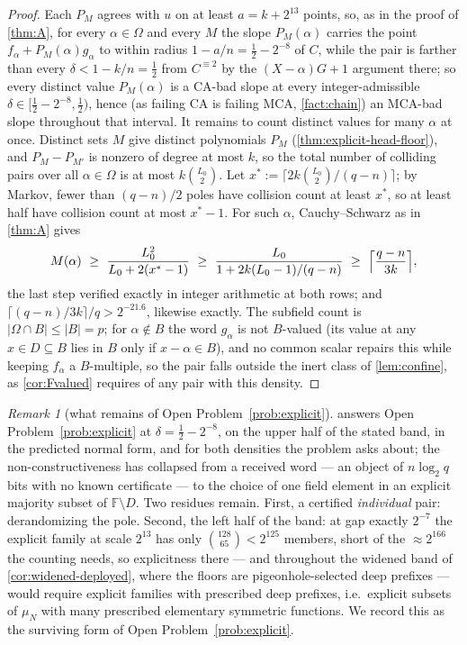 \documentclass[11pt]{article}
\theoremstyle{definition}
\theoremstyle{remark}
\newtheorem{remark}[theorem]{Remark}
\newcommand{\F}{\mathbb{F}}
\newcommand{\B}{B}
\begin{document}
\begin{proof}
Each $P_M$ agrees with $u$ on at least $a=k+2^{13}$ points, so, as in the proof of \cref{thm:A}, for every $\alpha\in\Omega$ and every $M$ the slope $P_M(\alpha)$ carries the point $f_\alpha+P_M(\alpha)g_\alpha$ to within radius $1-a/n=\frac12-2^{-8}$ of $C$, while the pair is farther than every $\delta<1-k/n=\frac12$ from $C^{\equiv2}$ by the $(X-\alpha)G+1$ argument there; so every distinct value $P_M(\alpha)$ is a CA-bad slope at every integer-admissible $\delta\in[\frac12-2^{-8},\frac12)$, hence \textup(as failing CA is failing MCA, \cref{fact:chain}\textup) an MCA-bad slope throughout that interval. It remains to count distinct values for many $\alpha$ at once. Distinct sets $M$ give distinct polynomials $P_M$ \textup(\cref{thm:explicit-head-floor}\textup), and $P_M-P_{M'}$ is nonzero of degree at most $k$, so the total number of colliding pairs over all $\alpha\in\Omega$ is at most $k\binom{L_0}2$. Let $x^*:=\lceil2k\binom{L_0}2/(q-n)\rceil$; by Markov, fewer than $(q-n)/2$ poles have collision count at least $x^*$, so at least half have collision count at most $x^*-1$. For such $\alpha$, Cauchy--Schwarz as in \cref{thm:A} gives
\[
M(\alpha)\ \ge\ \frac{L_0^2}{L_0+2(x^*-1)}\ \ge\ \frac{L_0}{1+2k(L_0-1)/(q-n)}\ \ge\ \Bigl\lceil\frac{q-n}{3k}\Bigr\rceil,
\]
the last step verified exactly in integer arithmetic at both rows; and $\lceil(q-n)/3k\rceil/q>2^{-21.6}$, likewise exactly. The subfield count is $|\Omega\cap\B|\le|\B|=p$; for $\alpha\notin\B$ the word $g_\alpha$ is not $\B$-valued \textup(its value at any $x\in D\subseteq\B$ lies in $\B$ only if $x-\alpha\in\B$\textup), and no common scalar repairs this while keeping $f_\alpha$ a $\B$-multiple, so the pair falls outside the inert class of \cref{lem:confine}, as \cref{cor:Fvalued} requires of any pair with this density.
\end{proof}

\begin{remark}[what remains of Open Problem~\ref{prob:explicit}]\label{rem:explicit-scope}
 answers Open Problem~\ref{prob:explicit} at $\delta=\frac12-2^{-8}$, on the upper half of the stated band, in the predicted normal form, and for both densities the problem asks about; the non-constructiveness has collapsed from a received word --- an object of $n\log_2q$ bits with no known certificate --- to the choice of one field element in an explicit majority subset of $\F\setminus D$. Two residues remain. First, a certified \emph{individual} pair: derandomizing the pole. Second, the left half of the band: at gap exactly $2^{-7}$ the explicit family at scale $2^{13}$ has only $\binom{128}{65}<2^{125}$ members, short of the $\approx2^{166}$ the counting needs, so explicitness there --- and throughout the widened band of \cref{cor:widened-deployed}, where the floors are pigeonhole-selected deep prefixes --- would require explicit families with prescribed deep prefixes, i.e.\ explicit subsets of $\mu_N$ with many prescribed elementary symmetric functions. We record this as the surviving form of Open Problem~\ref{prob:explicit}.
\end{remark}
\end{document}
